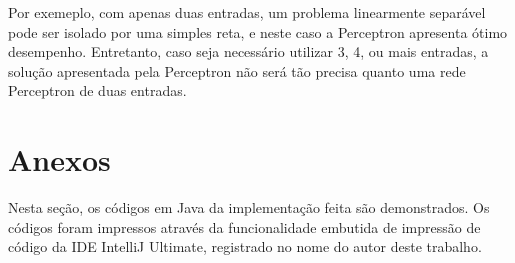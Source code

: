 \documentclass{article}
\begin{document}
\par Por exemeplo, com apenas duas entradas, um problema linearmente separável pode ser isolado por uma simples reta, e neste caso a Perceptron apresenta ótimo desempenho. Entretanto, caso seja necessário utilizar 3, 4, ou mais entradas, a solução apresentada pela Perceptron não será tão precisa quanto uma rede Perceptron de duas entradas.

\newpage
\section{Anexos}
\par Nesta seção, os códigos em Java da implementação feita são demonstrados. Os códigos foram impressos através da funcionalidade embutida de impressão de código da IDE IntelliJ Ultimate, registrado no nome do autor deste trabalho.



\end{document}
